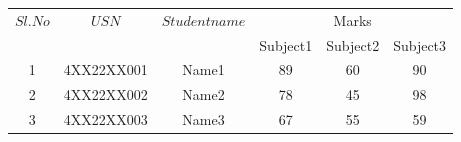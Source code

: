 \documentclass{article}
\begin{document}
\begin{tabular}{|c|c|c|c|c|c|}
\hline
$Sl.No$ & $USN$& $Student name$ &\multicolumn{3}{|c|}{Marks}\\ \cline{4-6}
& & & Subject1 & Subject2 &Subject3 \\ \hline
1& 4XX22XX001&Name1 &89 &60 &90 \\ \hline
2& 4XX22XX002&Name2 &78 &45 &98 \\ \hline
3& 4XX22XX003&Name3 &67 &55 &59 \\ \hline
\end{tabular}
\end{document}
